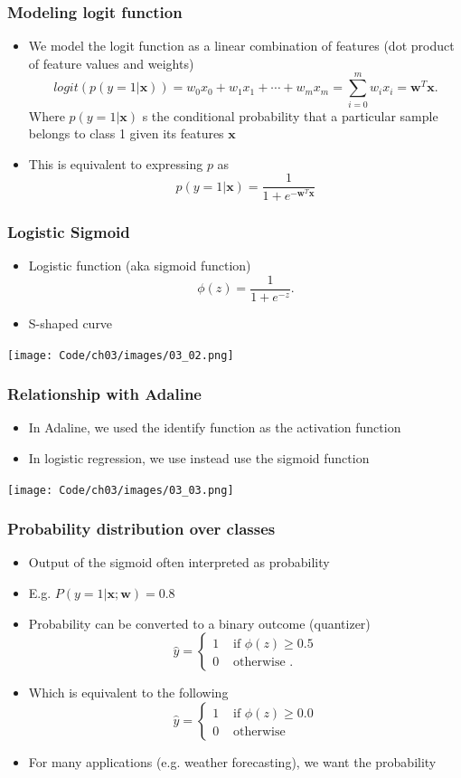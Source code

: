 \documentclass{beamer}
\begin{document}
\begin{frame}
  \frametitle{Modeling logit function}
  \begin{itemize}
  \item We model the logit function as a linear combination of features (dot product of feature values and weights)
    \[
    logit ( p (y=1 | \mathbf{x})) = w_0 x_0 + w_1 x_1 + \cdots + w_m x_m = \sum^{m}_{i=0} w_i x_i = \mathbf{w}^T \mathbf{x}.
    \]
    Where $p(y=1 | \mathbf{x})$ s the conditional probability that a particular sample belongs to class 1 given its features $\mathbf{x}$
  \item This is equivalent to expressing $p$ as
    \[
    p(y = 1 | \mathbf{x}) = \frac{1}{1 + e^{-\mathbf{w}^T \mathbf{x}}}
    \]
  \end{itemize}
\end{frame}

\begin{frame}
  \frametitle{Logistic Sigmoid}
  \begin{itemize}
  \item Logistic function (aka sigmoid function)
    \[
    \phi(z) = \frac{1}{1+e^{-z}}.
    \]
  \item S-shaped curve
  \end{itemize}
  \center
  \texttt{[image: Code/ch03/images/03\_02.png]}
\end{frame}

\begin{frame}
  \frametitle{Relationship with Adaline}
  \begin{itemize}
  \item In Adaline, we used the identify function as the activation function
  \item In logistic regression, we use instead use the sigmoid function
  \end{itemize}
  \texttt{[image: Code/ch03/images/03\_03.png]}
\end{frame}

\begin{frame}
  \frametitle{Probability distribution over classes}
  \begin{itemize}
  \item Output of the sigmoid often interpreted as probability
  \item E.g. $P(y=1 | \mathbf{x};\mathbf{w}) = 0.8$
  \item Probability can be converted to a binary outcome (quantizer)
  \[ \hat{y}= \begin{cases} 
    1 & \text{ if } \phi(z) \ge 0.5 \\
    0 & \text{ otherwise }.
    \end{cases}
  \]
\item Which is equivalent to the following
  \[ \hat{y}= \begin{cases} 
    1 & \text{ if } \phi(z) \ge 0.0 \\
    0 & \text{ otherwise }
    \end{cases}
  \]
  \item For many applications (e.g. weather forecasting), we want the probability
  \end{itemize}
\end{frame}
\end{document}
